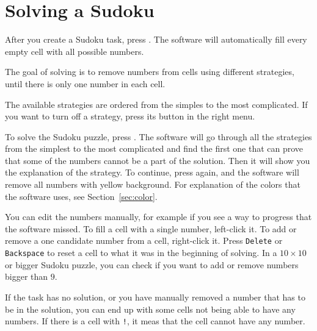 \section{Solving a Sudoku}

After you create a Sudoku task, press .
The software will automatically fill every empty cell with all possible numbers.

The goal of solving is to remove numbers from cells using different strategies,
until there is only one number in each cell.

The available strategies are ordered from the simples to the most complicated.
If you want to turn off a strategy, press its button in the right menu.

To solve the Sudoku puzzle, press .
The software will go through all the strategies from the simplest to the most complicated and
find the first one that can prove that some of the numbers cannot be a part of the solution.
Then it will show you the explanation of the strategy.
To continue, press  again,
and the software will remove all numbers with yellow background.
For explanation of the colors that the software uses, see Section~\ref{sec:color}.

You can edit the numbers manually, for example if you see a way to progress that the software missed.
To fill a cell with a single number, left-click it.
To add or remove a one candidate number from a cell, right-click it.
Press \texttt{Delete} or \texttt{Backspace} to reset a cell to what it was in the beginning of solving.
In a $10 \times 10$ or bigger Sudoku puzzle,
you can check  if you want to add or remove numbers bigger than $9$.

If the task has no solution, or you have manually removed a number that has to be in the solution,
you can end up with some cells not being able to have any numbers.
If there is a cell with \texttt{!}, it meas that the cell cannot have any number.


